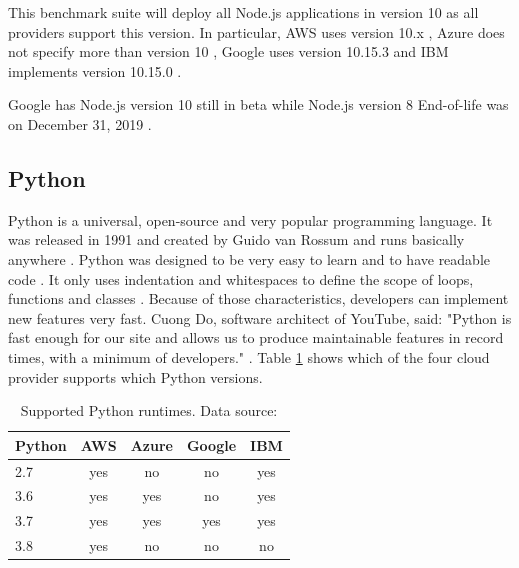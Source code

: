 This benchmark suite will deploy all Node.js applications in version 10 as all providers support this version. In particular, \gls{AWS} uses version 10.x \cite{AWSLambdaLanguages}, Azure does not specify more than version 10 \cite{AzureFunctionsLanguages}, Google uses version 10.15.3 \cite{GoogleFunctionsRuntimes} and \gls{IBM} implements version 10.15.0 \cite{IBMRuntimes}.

\begin{remark}
Google has Node.js version 10 still in beta while Node.js version 8 End-of-life was on December 31, 2019 \cite{NodejsReleases}.
\end{remark}

\newpage

\subsection{Python}

Python is a universal, open-source and very popular programming language. It was released in 1991 and created by Guido van Rossum \cite{PythonIntro} and runs basically anywhere \cite{PythonAbout}. Python was designed to be very easy to learn and to have readable code \cite{PythonIntro}. It only uses indentation and whitespaces to define the scope of loops, functions and classes \cite{PythonIntro}. Because of those characteristics, developers can implement new features very fast. Cuong Do, software architect of YouTube, said: "Python is fast enough for our site and allows us to produce maintainable features in record times, with a minimum of developers." \cite{PythonQuotes}. Table \ref{table:python} shows which of the four cloud provider supports which Python versions.

\begin{table}[htp]
\centering
\captionsetup[table]{justification=centering, labelfont=bf}
\begin{tabular}{|l|c|c|c|c|} 
 \hline
 Python & AWS & Azure & Google & IBM \\ \hline
2.7  & \cellcolor{green!25}yes    & \cellcolor{red!25}no    & \cellcolor{red!25}no  & \cellcolor{green!25}yes\\ \hline
3.6  & \cellcolor{green!25}yes & \cellcolor{green!25}yes & \cellcolor{red!25}no   & \cellcolor{green!25}yes \\ \hline
3.7 & \cellcolor{green!25}yes & \cellcolor{green!25}yes & \cellcolor{green!25}yes  & \cellcolor{green!25}yes \\ \hline
3.8 & \cellcolor{green!25}yes & \cellcolor{red!25}no & \cellcolor{red!25}no  & \cellcolor{red!25}no  \\ \hline
\end{tabular}
\caption[Supported Python runtimes]{Supported Python runtimes. Data source: \cite{AWSLambdaLanguages, AzureFunctionsLanguages, GoogleFunctionsLanguages, IBMRuntimes}}
\label{table:python}
\end{table}

